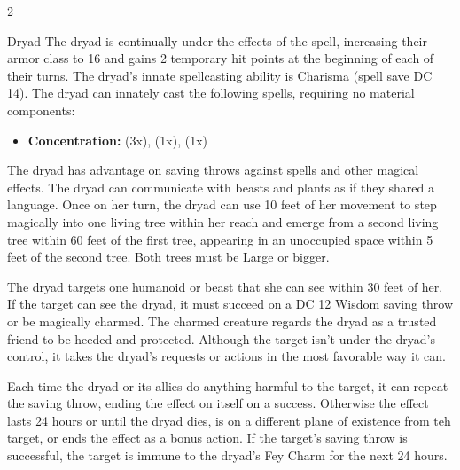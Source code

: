 \begin{multicols}{2}
\begin{DndMonster}{Dryad}
	\DndMonsterBasics[
		armor-class={16 (barkskin)},
		hit-points={27 (5d8 + 5)},
		speed={30 ft.}
	]
	\DndMonsterDetails[
		skills={Perception +4, Stealth +5},
		senses={darkvision 60 ft, passive perception 14},
		languages={Common, Sylvan},
		challenge={1:1}
	]
	 The dryad is continually under the effects of the  spell, increasing their armor class to 16 and gains 2 temporary hit points at the beginning of each of their turns.
	 The dryad's innate spellcasting ability is Charisma (spell save DC 14). The dryad can innately cast the following spells, requiring no material components:
	\begin{itemize}
		\item[] \textbf{Concentration:}  (3x),  (1x),  (1x)
	\end{itemize}
	 The dryad has advantage on saving throws against spells and other magical effects.
	 The dryad can communicate with beasts and plants as if they shared a language.
	 Once on her turn, the dryad can use 10 feet of her movement to step magically into one living tree within her reach and emerge from a second living tree within 60 feet of the first tree, appearing in an unoccupied space within 5 feet of the second tree. Both trees must be Large or bigger.

	\DndMonsterAttack[
		name=Club,
		distance=melee,
		type=weapon,
		mod=+4,
		reach=5,
		dmg=\DndDice{1d8 + 4},
		dmg-type=bludgeoning
	]
	 The dryad targets one humanoid or beast that she can see within 30 feet of her. If the target can see the dryad, it must succeed on a DC 12 Wisdom saving throw or be magically charmed. The charmed creature regards the dryad as a trusted friend to be heeded and protected. Although the target isn't under the dryad's control, it takes the dryad's requests or actions in the most favorable way it can.

	Each time the dryad or its allies do anything harmful to the target, it can repeat the saving throw, ending the effect on itself on a success. Otherwise the effect lasts 24 hours or until the dryad dies, is on a different plane of existence from teh target, or ends the effect as a bonus action. If the target's saving throw is successful, the target is immune to the dryad's Fey Charm for the next 24 hours.


\end{DndMonster}
\end{multicols}

